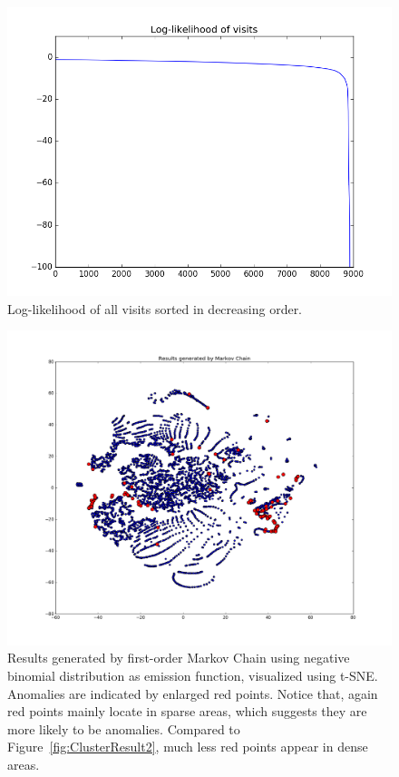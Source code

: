 \begin{figure}[!ht]
	\begin{center}
		\includegraphics[width=\textwidth]{images/likelihood}
		\caption{Log-likelihood of all visits sorted in decreasing order.}
		\label{fig:likelihood}
	\end{center}
\end{figure}

\begin{figure}[!ht]
	\begin{center}
		\includegraphics[width=\textwidth]{images/MarkovResult}
		\caption{Results generated by first-order Markov Chain using negative binomial distribution as emission function, visualized using t-SNE. Anomalies are indicated by enlarged red points. Notice that, again red points mainly locate in sparse areas, which suggests they are more likely to be anomalies. Compared to Figure~\ref{fig:ClusterResult2}, much less red points appear in dense areas.}
		\label{fig:MarkovResult}
	\end{center}
\end{figure}

